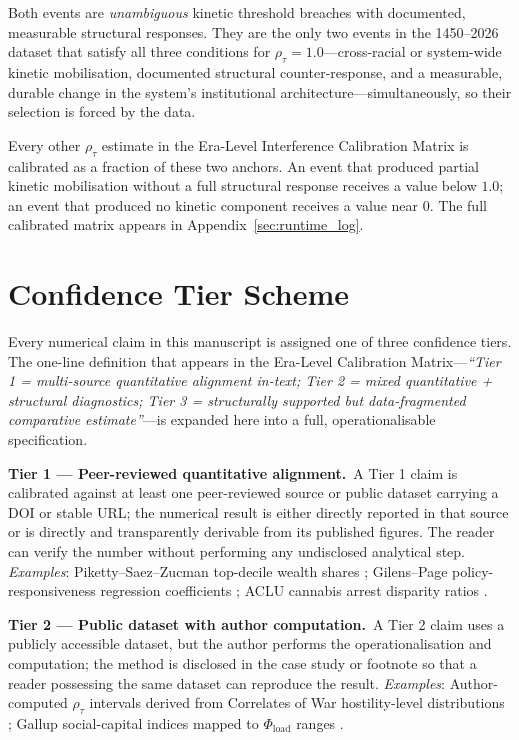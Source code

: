 \documentclass[12pt,openany]{book}
\numberwithin{equation}{chapter}
\begin{document}
Both events are \textit{unambiguous} kinetic threshold breaches with documented, measurable structural responses. They are the only two events in the 1450--2026 dataset that satisfy all three conditions for $\rho_\tau = 1.0$---cross-racial or system-wide kinetic mobilisation, documented structural counter-response, and a measurable, durable change in the system's institutional architecture---simultaneously, so their selection is forced by the data.

Every other $\rho_\tau$ estimate in the Era-Level Interference Calibration Matrix is calibrated as a fraction of these two anchors. An event that produced partial kinetic mobilisation without a full structural response receives a value below $1.0$; an event that produced no kinetic component receives a value near $0$. The full calibrated matrix appears in Appendix~\ref{sec:runtime_log}.

\section*{Confidence Tier Scheme}

Every numerical claim in this manuscript is assigned one of three confidence tiers. The one-line definition that appears in the Era-Level Calibration Matrix---\textit{``Tier 1 = multi-source quantitative alignment in-text; Tier 2 = mixed quantitative + structural diagnostics; Tier 3 = structurally supported but data-fragmented comparative estimate''}---is expanded here into a full, operationalisable specification.

\bigskip
\noindent\textbf{Tier 1 --- Peer-reviewed quantitative alignment.}\ A Tier 1 claim is calibrated against at least one peer-reviewed source or public dataset carrying a DOI or stable URL; the numerical result is either directly reported in that source or is directly and transparently derivable from its published figures. The reader can verify the number without performing any undisclosed analytical step. \textit{Examples}: Piketty--Saez--Zucman top-decile wealth shares \cite{piketty}; Gilens--Page policy-responsiveness regression coefficients \cite{gilens}; ACLU cannabis arrest disparity ratios \cite{aclu2013,aclu2020}.

\bigskip
\noindent\textbf{Tier 2 --- Public dataset with author computation.}\ A Tier 2 claim uses a publicly accessible dataset, but the author performs the operationalisation and computation; the method is disclosed in the case study or footnote so that a reader possessing the same dataset can reproduce the result. \textit{Examples}: Author-computed $\rho_\tau$ intervals derived from Correlates of War hostility-level distributions \cite{correlates_of_war}; Gallup social-capital indices mapped to $\Phi_{\text{load}}$ ranges \cite{gallup_social}.
\end{document}
